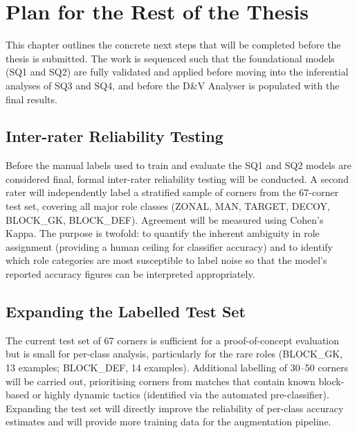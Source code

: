 
\chapter{Plan for the Rest of the Thesis}
\label{ch:plan}

This chapter outlines the concrete next steps that will be completed
before the thesis is submitted. The work is sequenced such that the
foundational models (SQ1 and SQ2) are fully validated and applied
before moving into the inferential analyses of SQ3 and SQ4, and before
the D\&V Analyser is populated with the final results.

\section{Inter-rater Reliability Testing}
\label{sec:plan_interrater}

Before the manual labels used to train and evaluate the SQ1 and SQ2
models are considered final, formal inter-rater reliability testing will
be conducted. A second rater will independently label a stratified
sample of corners from the 67-corner test set, covering all major role
classes (ZONAL, MAN, TARGET, DECOY, BLOCK\_GK, BLOCK\_DEF). Agreement
will be measured using Cohen's Kappa. The purpose is twofold: to
quantify the inherent ambiguity in role assignment (providing a human
ceiling for classifier accuracy) and to identify which role categories
are most susceptible to label noise so that the model's reported
accuracy figures can be interpreted appropriately.

\section{Expanding the Labelled Test Set}
\label{sec:plan_labelling}

The current test set of 67 corners is sufficient for a proof-of-concept
evaluation but is small for per-class analysis, particularly for the
rare roles (BLOCK\_GK, 13 examples; BLOCK\_DEF, 14 examples). Additional
labelling of 30--50 corners will be carried out, prioritising corners
from matches that contain known block-based or highly dynamic tactics
(identified via the automated pre-classifier). Expanding the test set
will directly improve the reliability of per-class accuracy estimates
and will provide more training data for the augmentation pipeline.

